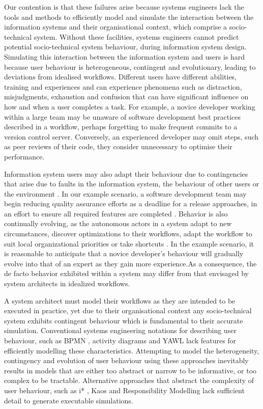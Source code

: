 \documentclass{llncs}
\begin{document}
Our contention is that these failures arise because systems engineers lack the tools and methods to efficiently model
and simulate the interaction between the information systems and their organisational context, which comprise a socio-
technical system. Without these facilities, systems engineers cannot predict potential socio-technical system behaviour,
during information system design. Simulating this interaction between the information system and users is hard because
user behaviour is heterogeneous, contingent and evolutionary, leading to deviations from idealised workflows.  Different
users have different abilities, training and experiences and can experience phenomena such as distraction, misjudgments,
exhaustion and confusion that can have significant influence on how and when a user completes a task.  For example, a
novice developer working within a large team may be unaware of software development best practices described in a
workflow, perhaps forgetting to make frequent commits to a version control server.  Conversely, an experienced developer
may omit steps, such as peer reviews of their code, they consider unnecessary to optimise their performance.

Information system users may also adapt their behaviour due to contingencies that arise due to faults in the information
system, the behaviour of other users or the environment \citep{sommerville09deriving}.  In our example scenario, a
software development team may begin reducing quality assurance efforts as a deadline for a release approaches, in an
effort to ensure all required features are completed \citep{beck02test}. Behavior is also continually evolving, as the
autonomous actors in a system adapt to new circumstances, discover optimizations to their workflows, adapt the workflow
to suit local organizational priorities or take shortcuts
\citep{anderson04heterogeneous,bonen79evolutionary,lyytinen2008explaining}.  In the example scenario, it is reasonable
to anticipate that a novice developer's behaviour will gradually evolve into that of an expert as they gain more
experience.As a consequence, the de facto behavior exhibited within a system may differ from that envisaged by system
architects in idealized workflows.

A system architect must model their workflows as they are intended to be executed in practice, yet due to their
organisational context any socio-technical system exhibits contingent behaviour which is fundamental to their accurate
simulation. Conventional systems engineering notations for describing user behaviour, such as BPMN \citep{omg2011omgbpmn},
activity diagrams \citep{omg07omguml} and YAWL \citep{hofstede2010yawl} lack features for efficiently modelling these
characteristics.  Attempting to model the heterogeneity, contingency and evolution of user behaviour using these
approaches inevitably results in models that are either too abstract or narrow to be informative, or too complex to be
tractable.  Alternative approaches that abstract the complexity of user behaviour, such as i* \citep{yu1995social},
Kaos \citep{werneck2009goreistarkaos} and Responsibility Modelling \citep{sommerville09deriving} lack sufficient detail to
generate executable simulations.
\end{document}

